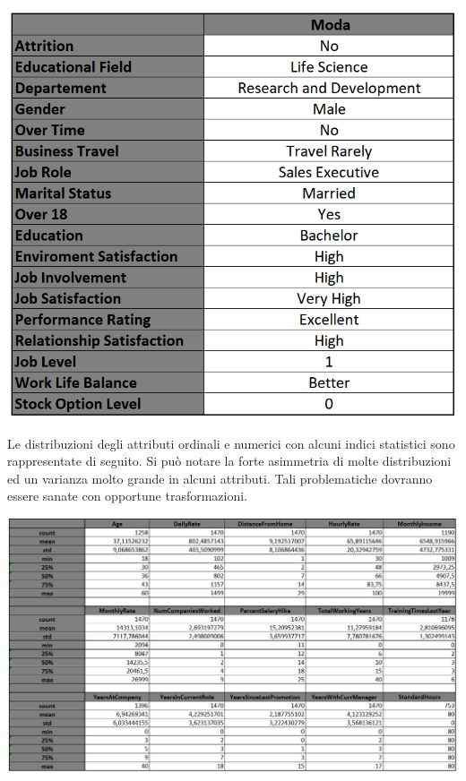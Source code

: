 \documentclass[a4paper,9pt]{article}
\begin{document}
\begin{center}
\includegraphics[scale=1]{modacategoriciordinali.png}
\end{center}
 
 
Le distribuzioni degli attributi ordinali e numerici con alcuni indici statistici sono rappresentate di seguito.
Si può notare la forte asimmetria di molte distribuzioni ed un varianza molto grande in alcuni attributi. Tali problematiche dovranno essere sanate con opportune trasformazioni.

\begin{center}
\includegraphics[scale=1.1]{statistica.png}
\end{center}
\end{document}
